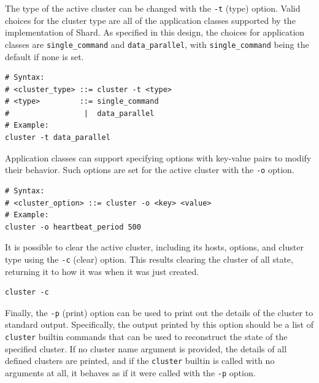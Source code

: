 \documentclass[oneside]{report}
\begin{document}
The type of the active cluster can be changed with the \texttt{-t} (type) option.
Valid choices for the cluster type are all of the application classes supported by the implementation of Shard.
As specified in this design, the choices for application classes are \texttt{single\_command} and \texttt{data\_parallel}, with \texttt{single\_command} being the default if none is set.

\begin{minipage}[c]{\textwidth-15pt}
  \begin{lstlisting}[language=Shard]
# Syntax:
# <cluster_type> ::= cluster -t <type>
# <type>         ::= single_command
#                 |  data_parallel
# Example:
cluster -t data_parallel
\end{lstlisting}
  \smallskip
\end{minipage}

Application classes can support specifying options with key-value pairs to modify their behavior. Such options are set for the active cluster with the \texttt{-o} option.

\begin{minipage}[c]{\textwidth-15pt}
  \begin{lstlisting}[language=Shard]
# Syntax:
# <cluster_option> ::= cluster -o <key> <value>
# Example:
cluster -o heartbeat_period 500
\end{lstlisting}
  \smallskip
\end{minipage}

It is possible to clear the active cluster, including its hosts, options, and cluster type using the \texttt{-c} (clear) option.
This results clearing the cluster of all state, returning it to how it was when it was just created.

\begin{minipage}[c]{\textwidth-15pt}
  \begin{lstlisting}[language=Shard]
cluster -c
\end{lstlisting}
  \smallskip
\end{minipage}

Finally, the \texttt{-p} (print) option can be used to print out the details of the cluster to standard output.
Specifically, the output printed by this option should be a list of \texttt{cluster} builtin commands that can be used to reconstruct the state of the specified cluster.
If no cluster name argument is provided, the details of all defined clusters are printed, and if the \texttt{cluster} builtin is called with no arguments at all, it behaves as if it were called with the \texttt{-p} option.
\end{document}
